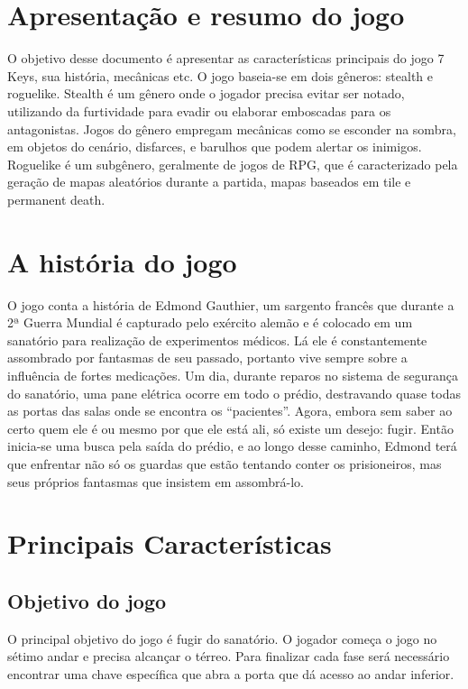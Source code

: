 \documentclass{article}
\begin{document}


\section{Apresentação e resumo do jogo}
     O objetivo desse documento é apresentar as características principais do jogo 7 Keys, sua história, mecânicas etc.
     O jogo baseia-se em dois gêneros: stealth e roguelike. Stealth é um gênero onde o jogador precisa evitar ser notado, utilizando da furtividade para evadir ou elaborar emboscadas para os antagonistas. Jogos do gênero empregam mecânicas como se esconder na sombra, em objetos do cenário, disfarces, e barulhos que podem alertar os inimigos. Roguelike é um subgênero, geralmente de jogos de RPG, que é caracterizado pela geração de mapas aleatórios durante a partida, mapas baseados em tile e permanent death.

\section{A história do jogo}
    O jogo conta a história de Edmond Gauthier, um sargento francês que durante a 2ª Guerra Mundial é capturado pelo exército alemão e é colocado em um sanatório para realização de experimentos médicos. Lá ele é constantemente assombrado por fantasmas de seu passado, portanto vive sempre sobre a influência de fortes medicações. 
    Um dia, durante reparos no sistema de segurança do sanatório, uma pane elétrica ocorre em todo o prédio, destravando quase todas as portas das salas onde se encontra os “pacientes”. Agora, embora sem saber ao certo quem ele é ou mesmo por que ele está ali, só existe um desejo: fugir. Então inicia-se uma busca pela saída do prédio, e ao longo desse caminho, Edmond terá que enfrentar não só os guardas que estão tentando conter os prisioneiros, mas seus próprios fantasmas que insistem em assombrá-lo.
    
\section{Principais Características}
\subsection{Objetivo do jogo}
O principal objetivo do jogo é fugir do sanatório. O jogador começa o jogo no sétimo andar e precisa alcançar o térreo. Para finalizar cada fase será necessário encontrar uma chave específica que abra a porta que dá acesso ao andar inferior.
\end{document}
